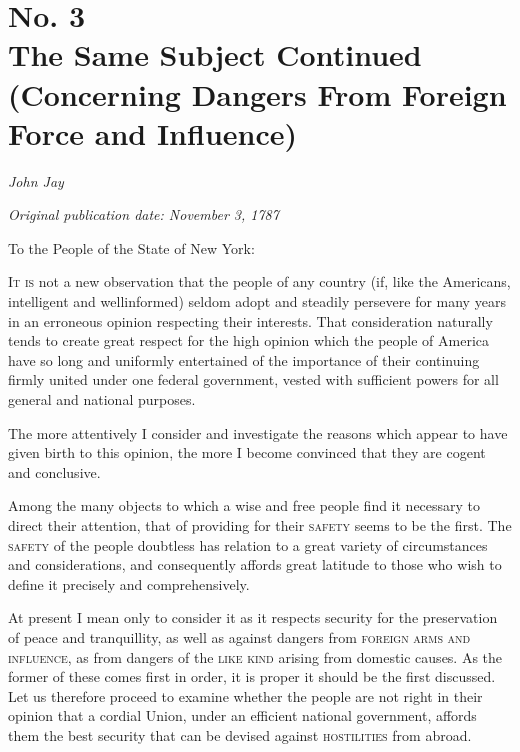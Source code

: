 \chapter[No. 3: The Same Subject Continued (Concerning Dangers From Foreign Force and Influence)]{No. 3\\ {\small The Same Subject Continued (Concerning Dangers From Foreign Force and Influence)}}

\textit{John Jay}

\textit{Original publication date: November 3, 1787}
\vspace{1cm}

To the People of the State of New York:
\vspace{.4cm}

\textsc{It is} not a new observation that the people of any country (if, like the Americans, intelligent and wellinformed) seldom adopt and steadily persevere for many years in an erroneous opinion respecting their interests. 
That consideration naturally tends to create great respect for the high opinion which the people of America have so long and uniformly entertained of the importance of their continuing firmly united under one federal government, vested with sufficient powers for all general and national purposes.

The more attentively I consider and investigate the reasons which appear to have given birth to this opinion, the more I become convinced that they are cogent and conclusive.

Among the many objects to which a wise and free people find it necessary to direct their attention, that of providing for their \textsc{safety} seems to be the first. 
The \textsc{safety} of the people doubtless has relation to a great variety of circumstances and considerations, and consequently affords great latitude to those who wish to define it precisely and comprehensively.

At present I mean only to consider it as it respects security for the preservation of peace and tranquillity, as well as against dangers from \textsc{foreign arms and influence}, as from dangers of the \textsc{like kind} arising from domestic causes. 
As the former of these comes first in order, it is proper it should be the first discussed. 
Let us therefore proceed to examine whether the people are not right in their opinion that a cordial Union, under an efficient national government, affords them the best security that can be devised against \textsc{hostilities} from abroad.

